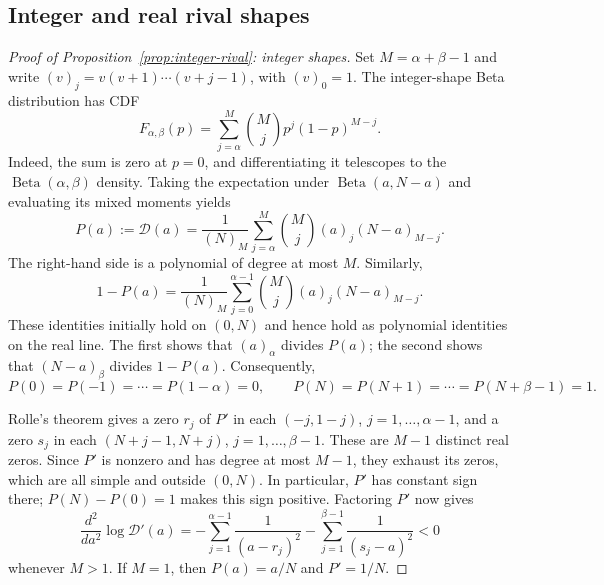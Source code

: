 \documentclass[11pt]{article}
\DeclareMathOperator{\Beta}{Beta}
\theoremstyle{definition}
\begin{document}
\subsection{Integer and real rival shapes}\label{app:integer-rival}

\begin{proof}[Proof of Proposition~\ref{prop:integer-rival}: integer shapes]
Set $M=\alpha+\beta-1$ and write $(v)_j=v(v+1)\cdots(v+j-1)$,
with $(v)_0=1$. The integer-shape Beta distribution has CDF
\begin{equation*}
F_{\alpha,\beta}(p)=\sum_{j=\alpha}^{M}\binom{M}{j}
p^j(1-p)^{M-j}.
\end{equation*}
Indeed, the sum is zero at $p=0$, and differentiating it telescopes to the
$\Beta(\alpha,\beta)$ density. Taking the expectation under
$\Beta(a,N-a)$ and evaluating its mixed moments yields
\begin{equation}\label{eq:integer-demand-polynomial}
P(a):=\mathcal D(a)=\frac{1}{(N)_M}
\sum_{j=\alpha}^{M}\binom{M}{j}(a)_j(N-a)_{M-j}.
\end{equation}
The right-hand side is a polynomial of degree at most $M$. Similarly,
\begin{equation*}
1-P(a)=\frac{1}{(N)_M}
\sum_{j=0}^{\alpha-1}\binom{M}{j}(a)_j(N-a)_{M-j}.
\end{equation*}
These identities initially hold on $(0,N)$ and hence hold as polynomial
identities on the real line. The first shows that $(a)_\alpha$ divides
$P(a)$; the second shows that $(N-a)_\beta$ divides $1-P(a)$.
Consequently,
\begin{equation*}
P(0)=P(-1)=\cdots=P(1-\alpha)=0,
\qquad
P(N)=P(N+1)=\cdots=P(N+\beta-1)=1.
\end{equation*}

Rolle's theorem gives a zero $r_j$ of $P'$ in each $(-j,1-j)$,
$j=1,\ldots,\alpha-1$, and a zero $s_j$ in each
$(N+j-1,N+j)$, $j=1,\ldots,\beta-1$. These are $M-1$ distinct real
zeros. Since $P'$ is nonzero and has degree at most $M-1$, they exhaust
its zeros, which are all simple and outside $(0,N)$. In particular, $P'$
has constant sign there; $P(N)-P(0)=1$ makes this sign positive.
Factoring $P'$ now gives
\begin{equation}\label{eq:integer-curvature}
\frac{d^2}{da^2}\log\mathcal D'(a)
=-\sum_{j=1}^{\alpha-1}\frac{1}{(a-r_j)^2}
 -\sum_{j=1}^{\beta-1}\frac{1}{(s_j-a)^2}<0
\end{equation}
whenever $M>1$. If $M=1$, then $P(a)=a/N$ and $P'=1/N$.
\end{proof}
\end{document}
